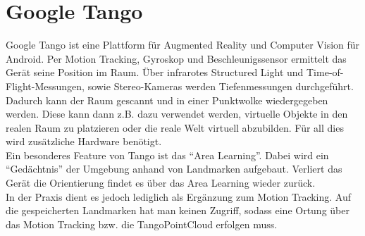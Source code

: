 
\section{Google Tango}
Google Tango ist eine Plattform für Augmented Reality und Computer Vision für Android. Per Motion Tracking, Gyroskop und Beschleunigssensor ermittelt das Gerät seine Position im Raum. Über infrarotes Structured Light und Time-of-Flight-Messungen, sowie Stereo-Kameras werden Tiefenmessungen durchgeführt. Dadurch kann der Raum gescannt und in einer Punktwolke wiedergegeben werden. Diese kann dann z.B. dazu verwendet werden, virtuelle Objekte in den realen Raum zu platzieren oder die reale Welt virtuell abzubilden. Für all dies wird zusätzliche Hardware benötigt.\cite{fehling}\\
Ein besonderes Feature von Tango ist das "`Area Learning"'. Dabei wird ein "`Gedächtnis"' der Umgebung anhand von Landmarken aufgebaut. Verliert das Gerät die Orientierung findet es über das Area Learning wieder zurück.\cite{fehling}\\
In der Praxis dient es jedoch lediglich als Ergänzung zum Motion Tracking. Auf die gespeicherten Landmarken hat man keinen Zugriff, sodass eine Ortung über das Motion Tracking bzw. die TangoPointCloud erfolgen muss.